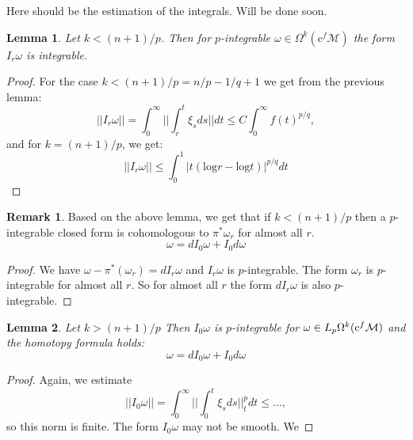 \documentclass[licencjacka]{pracamgr}
\theoremstyle{definition}
\theoremstyle{definition}
\newtheorem{remark}{Remark}[section]
\theoremstyle{plain}
\newtheorem{lemma}{Lemma}[section]
\theoremstyle{plain}
\def\cfm{\ensuremath\mathrm{c}^f\mathcal{M}}
\begin{document}
Here should be %
 the estimation of the integrals. Will be done soon.


\begin{lemma}
   Let $k < (n+1)/p$. Then for $p$-integrable $\omega \in
   \Omega^k(\mathrm{c}^f\mathcal{M})$ the form $I_r\omega$ is
   integrable.
\end{lemma}
\begin{proof}
  For the case $k < (n+1)/p = n/p - 1/q + 1$ we get from the previous lemma:
\[
||I_r\omega|| = \int_0^\infty ||\int_r^t \xi_s ds|| dt \leq
 C \int_0^\infty f(t)^{p/q},
\]
and for $k=(n+1)/p$, we get:
\[
  ||I_r\omega|| \leq \int_0^1 | t(\mathrm{log} r - \mathrm{log} t)  |^{p/q} dt
\]
\end{proof}

\begin{remark} %
  Based on the above lemma, we get that if $k<(n+1)/p$ then a $p$-integrable
closed form is cohomologous to $\pi^\ast \omega_r$ for almost all $r$.
\[
    \omega = dI_0\omega + I_0d\omega
\]
\end{remark}
\begin{proof}
  We have $\omega - \pi^\ast(\omega_r) = dI_r\omega$ and $I_r \omega$ is 
$p$-integrable. The form $\omega_r$ is $p$-integrable for almost all $r$.
So for almost all $r$ the form $dI_r\omega$ is also $p$-integrable.
\end{proof}

\begin{lemma} %
  Let $k > (n+1)/p$ Then $I_0 \omega $ is $p$-integrable for 
$\omega \in L_p \Omega^k(\cfm)$ and the homotopy formula holds:
\[
    \omega = d I_0 \omega + I_0 d \omega
\]
\end{lemma}
\begin{proof}
  Again, we estimate 
\[
    ||I_0 \omega|| = \int_0^\infty ||\int_0^t \xi_s ds||_t^p dt \leq
    ...,
\]
so this norm is finite. The form $I_0 \omega$ may not be smooth. We
\end{proof}







\end{document}
